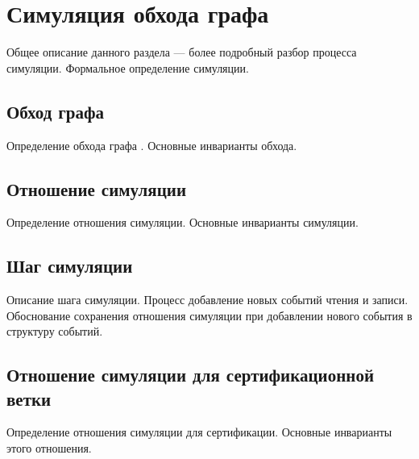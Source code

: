 \section{Симуляция обхода графа \IMM}

Общее описание данного раздела --- более подробный разбор процесса симуляции.
Формальное определение симуляции.

\subsection{Обход графа \IMM}

Определение обхода графа \IMM. Основные инварианты обхода.


\subsection{Отношение симуляции}

Определение отношения симуляции. Основные инварианты симуляции.

\subsection{Шаг симуляции}

Описание шага симуляции. Процесс добавление новых событий чтения и записи.
Обоснование сохранения отношения симуляции при добавлении
нового события в структуру событий.

\subsection{Отношение симуляции для сертификационной ветки}

Определение отношения симуляции для сертификации. Основные инварианты этого отношения.
